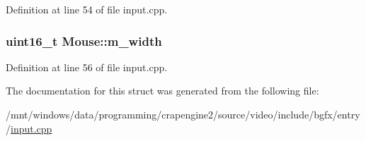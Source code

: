 Definition at line 54 of file input.\+cpp.

\hypertarget{struct_mouse_a1685d1fc66a9b6092feaee590c7bd83e}{
\subsubsection[{m\+\_\+width}]{\setlength{\rightskip}{0pt plus 5cm}uint16\+\_\+t Mouse\+::m\+\_\+width}}\label{struct_mouse_a1685d1fc66a9b6092feaee590c7bd83e}


Definition at line 56 of file input.\+cpp.



The documentation for this struct was generated from the following file\+:\begin{DoxyCompactItemize}
\item 
/mnt/windows/data/programming/crapengine2/source/video/include/bgfx/entry/\hyperlink{input_8cpp}{input.\+cpp}\end{DoxyCompactItemize}
